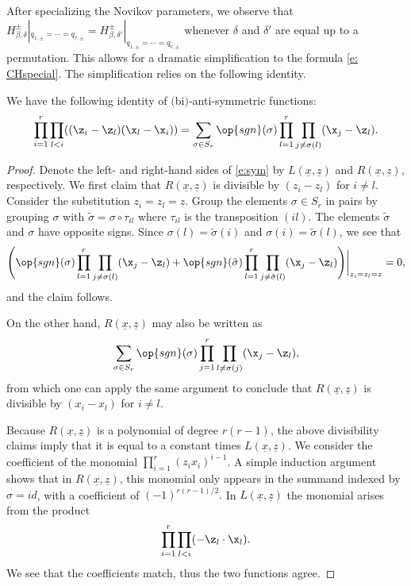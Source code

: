 After specializing the Novikov parameters, we observe that
$H^{{\pm}}_{\beta, \delta}|_{q_{1, \pm} = \cdots =q_{r, \pm}} = H^{{\pm}}_{\beta, \delta '}|_{q_{1, \pm} = \cdots =q_{r, \pm}}$
whenever $\delta$ and $\delta '$ are equal up to a permutation. This allows for a dramatic simplification to the formula \eqref{e: CHspecial}. The simplification relies on the following identity.
\begin{Lemma}\label{l:sym}
We have the following identity of $($bi$)$-anti-symmetric functions:
\begin{equation}\label{e:sym}
\prod_{i=1}^r \prod_{l<i} ((\z_i - \z_l)(\x_l - \x_i) ) = \sum_{\sigma \in S_r} \op{sgn}(\sigma) \prod_{l=1}^r \prod_{j \neq \sigma(l)} (\x_j - \z_l).
\end{equation}
\end{Lemma}

\begin{proof}
Denote the left- and right-hand sides of \eqref{e:sym} by $L(\underline x, \underline z)$ and $R(\underline x, \underline z)$, respectively.
We first claim that $R(\underline x, \underline z)$ is divisible by $(z_i - z_l)$ for $i \neq l$. Consider the substitution $z_i = z_l = z$.
Group the elements $\sigma \in S_r$ in pairs by grouping $\sigma$ with $\tilde \sigma = \sigma \circ \tau_{il}$ where $\tau_{il}$ is the transposition $(il)$. The elements $\tilde \sigma$ and $\sigma$ have opposite signs. Since $\sigma(l) = \tilde \sigma(i)$ and $\sigma(i) = \tilde \sigma(l)$, we see that
\[
\Biggl(\op{sgn}(\sigma) \prod_{l=1}^r \prod_{j \neq \sigma(l)} (\x_j - \z_l) + \op{sgn}(\tilde \sigma) \prod_{l=1}^r \prod_{j \neq \tilde \sigma(l)} (\x_j - \z_l)\Biggr)\bigg|_{z_i = z_l = z} = 0,
\]
and the claim follows.

On the other hand, $R(\underline x, \underline z)$ may also be written as
\[
\sum_{\sigma \in S_r} \op{sgn}(\sigma) \prod_{j=1}^r \prod_{l \neq \sigma(j)} (\x_j - \z_l),
\]
from which one can apply the same argument to conclude that $R(\underline x, \underline z)$ is divisible by $(x_i - x_l)$ for $i \neq l$.

Because $R(\underline x, \underline z)$ is a polynomial of degree $r(r-1)$, the above divisibility claims imply that it is equal to a constant times $L(\underline x, \underline z)$. We consider the coefficient of the monomial
$\prod_{i=1}^r (z_i x_i)^{i-1}$. A simple induction argument shows that in $R(\underline x, \underline z)$, this monomial only appears in the summand indexed by $\sigma = id$, with a coefficient of $(-1)^{r(r-1)/2}.$ In $L(\underline x, \underline z)$ the monomial arises from the product
\[
\prod_{i=1}^r \prod_{l<i} (- \z_l \cdot \x_l ).
\]
We see that the coefficients match, thus the two functions agree.
\end{proof}

